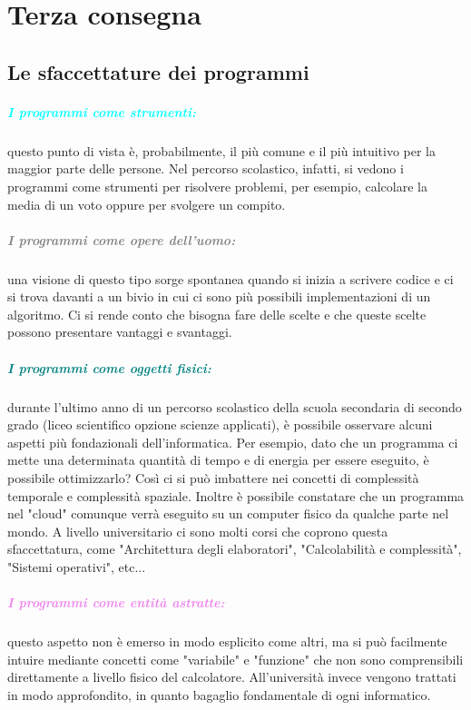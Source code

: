 \chapter{Terza consegna}

\section{Le sfaccettature dei programmi}

\paragraph{\textcolor{cyan}{I programmi come strumenti:}} 
questo punto di vista è, probabilmente, il più comune e il più intuitivo 
per la maggior parte delle persone. Nel percorso scolastico, infatti,
si vedono i programmi come strumenti per risolvere problemi, per esempio,
calcolare la media di un voto oppure per svolgere un compito.

\paragraph{\textcolor{gray}{I programmi come opere dell'uomo:}}
una visione di questo tipo sorge spontanea quando si inizia a scrivere
codice e ci si trova davanti a un bivio in cui ci sono più possibili 
implementazioni di un algoritmo. Ci si rende conto che bisogna
fare delle scelte e che queste scelte possono presentare vantaggi e
svantaggi.

\paragraph{\textcolor{teal}{I programmi come oggetti fisici:}} 
durante l'ultimo anno di un percorso scolastico della scuola
secondaria di secondo grado (liceo scientifico opzione scienze applicati), è possibile osservare alcuni aspetti più
fondazionali dell'informatica. Per esempio, dato che un programma ci
mette una determinata quantità di tempo e di energia per essere eseguito,
è possibile ottimizzarlo? Così ci si può imbattere nei concetti di complessità
temporale e complessità spaziale. Inoltre è possibile constatare 
che un programma nel "cloud" comunque verrà eseguito su un computer
fisico da qualche parte nel mondo. A livello universitario ci sono molti 
corsi che coprono questa sfaccettatura, come "Architettura degli elaboratori",
"Calcolabilità e complessità", "Sistemi operativi", etc...

\paragraph{\textcolor{violet}{I programmi come entità astratte:}}
questo aspetto non è emerso in modo esplicito come altri, ma si può 
facilmente intuire mediante concetti come "variabile" e "funzione"
che non sono comprensibili direttamente a livello fisico del calcolatore.
All'università invece vengono trattati in modo approfondito, in quanto
bagaglio fondamentale di ogni informatico.


